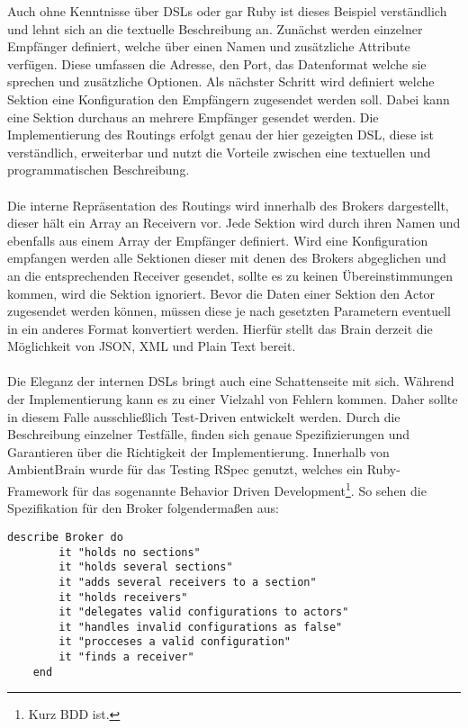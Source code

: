 Auch ohne Kenntnisse über DSLs oder gar Ruby ist dieses Beispiel verständlich und lehnt sich an die textuelle Beschreibung an. Zunächst werden einzelner Empfänger definiert, welche über einen Namen und zusätzliche Attribute verfügen. Diese umfassen die Adresse, den Port, das Datenformat welche sie sprechen und zusätzliche Optionen. Als nächster Schritt wird definiert welche Sektion eine Konfiguration den Empfängern zugesendet werden soll. Dabei kann eine Sektion durchaus an mehrere Empfänger gesendet werden. Die Implementierung des Routings erfolgt genau der hier gezeigten DSL, diese ist verständlich, erweiterbar und nutzt die Vorteile zwischen eine textuellen und programmatischen Beschreibung. 
\\\\
Die interne Repräsentation des Routings wird innerhalb des Brokers dargestellt, dieser hält ein Array an Receivern vor. Jede Sektion wird durch ihren Namen und ebenfalls aus einem Array der Empfänger definiert. Wird eine Konfiguration empfangen werden alle Sektionen dieser mit denen des Brokers abgeglichen und an die entsprechenden Receiver gesendet, sollte es zu keinen Übereinstimmungen kommen, wird die Sektion ignoriert. Bevor die Daten einer Sektion den Actor zugesendet werden können, müssen diese je nach gesetzten Parametern eventuell in ein anderes Format konvertiert werden. Hierfür stellt das Brain derzeit die Möglichkeit von JSON, XML und Plain Text bereit. 
\\\\
Die Eleganz der internen DSLs bringt auch eine Schattenseite mit sich. Während der Implementierung kann es zu einer Vielzahl von Fehlern kommen. Daher sollte in diesem Falle ausschließlich Test-Driven entwickelt werden. Durch die Beschreibung einzelner Testfälle, finden sich genaue Spezifizierungen und Garantieren über die Richtigkeit der Implementierung. Innerhalb von AmbientBrain wurde für das Testing RSpec genutzt, welches ein Ruby-Framework für das sogenannte Behavior Driven Development\footnote{Kurz BDD ist.}. So sehen die Spezifikation für den Broker folgendermaßen aus: 

\lstset{language=Ruby}
\begin{lstlisting}[caption=Beschreibung der RSpec-Tests , captionpos=b]
	describe Broker do
		it "holds no sections"
		it "holds several sections"
		it "adds several receivers to a section" 
		it "holds receivers" 
		it "delegates valid configurations to actors" 
		it "handles invalid configurations as false" 
		it "procceses a valid configuration" 
		it "finds a receiver" 
	end

\end{lstlisting}

